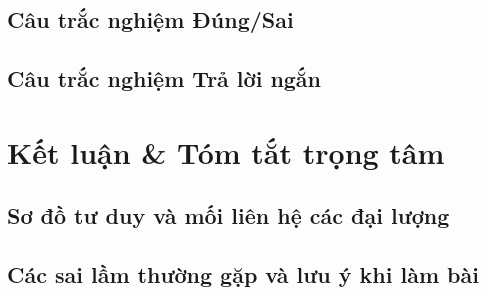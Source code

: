 \documentclass[12pt]{article}
\begin{document}
	\newpage
	\subsection{Câu trắc nghiệm Đúng/Sai}
	
	\newpage
	\subsection{Câu trắc nghiệm Trả lời ngắn}
	
	\newpage
	
	\section{Kết luận \& Tóm tắt trọng tâm}\label{sec:ketluan}
	
	\subsection{Sơ đồ tư duy và mối liên hệ các đại lượng}
	
	\subsection{Các sai lầm thường gặp và lưu ý khi làm bài}
\end{document}
